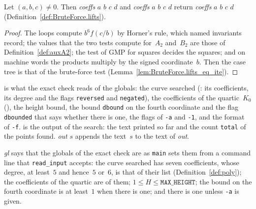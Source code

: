 \begin{lemma}\label{lem:checkLifts_spec}
  \leanok
  Let $(a, b, c) \ne 0$. Then  \textit{coeffs} $a$ $b$ $c$ $d$ and
   \textit{coeffs} $a$ $b$ $c$ $d$
  return  \textit{coeffs} $a$ $b$ $c$ $d$
  (Definition~\ref{def:BruteForce.lifts}).
\end{lemma}

\begin{proof}
  \leanok
  The loops compute $b^6 f(c/b)$ by Horner's rule, which named invariants record; the values that
  the two tests compute for~$A_2$ and~$B_2$ are those of Definition~\ref{def:auxA2}; the test of GMP
  for squares decides the squares; and on machine words the products multiply by the signed
  coordinate~$b$. Then the case tree is that of the brute-force test
  (Lemma~\ref{lem:BruteForce.lifts_eq_ite}).
\end{proof}

\begin{definition}\label{def:CheckGlobals}
  \leanok
   is what the exact check reads of the globals: the curve searched
  (: its coefficients, its degree and the flags \texttt{reversed} and
  \texttt{negated}), the coefficients of the quartic~$K_0$ (), the
  height bound, the bound \texttt{dbound} on the fourth coordinate and the flag \texttt{dbounded}
  that says whether there is one, the flags of \texttt{-a} and \texttt{-1}, and the format of
  \texttt{-f}.  is the output of the search: the text printed so far and the
  count \texttt{total} of the points found.  \textit{out} $s$ appends
  the text~$s$ to the text of \textit{out}.
\end{definition}

\begin{definition}\label{def:CheckGlobals.WF}
  \leanok
   \textit{gl} says that the globals of the exact check are as
  \texttt{main} sets them from a command line that \texttt{read\_input} accepts: the curve searched
  has seven coefficients, whose degree, at least~$5$ and hence~$5$ or~$6$, is that of their list
  (Definition~\ref{def:poly}); the coefficients of the quartic are  of
  them; $1 \le H \le \mathtt{MAX\_HEIGHT}$; the bound on the fourth coordinate is at least~$1$ when
  there is one; and there is one unless \texttt{-a} is given.
\end{definition}

